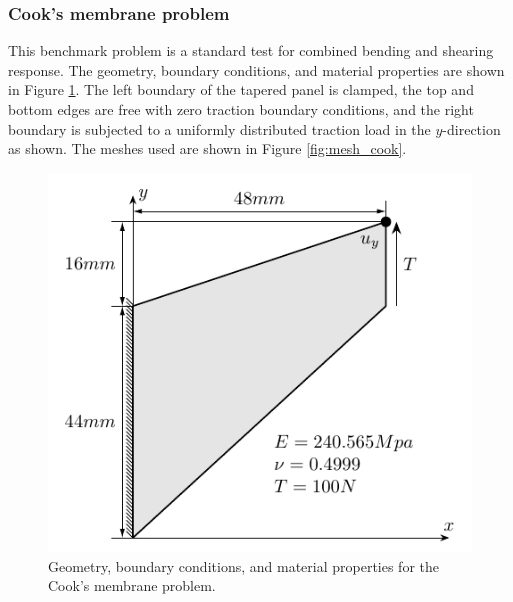\documentclass{article}
\begin{document}
\subsubsection{Cook's membrane problem}

This benchmark problem is a standard test for combined bending and shearing response. The geometry, boundary conditions, and material properties are shown in Figure \ref{fig:Cook's}. The left boundary of the tapered panel is clamped, the top and bottom edges are free with zero traction boundary conditions, and the right boundary is subjected to a uniformly distributed traction load in the $y$-direction as shown. The meshes used are shown in Figure \ref{fig:mesh_cook}.
\begin{figure}[htb!]
	\centering
	\includegraphics[width=0.5\linewidth]{Cook_s}
	\caption{Geometry, boundary conditions, and material properties for the Cook's membrane problem.}
	\label{fig:Cook's}
\end{figure}
\end{document}
